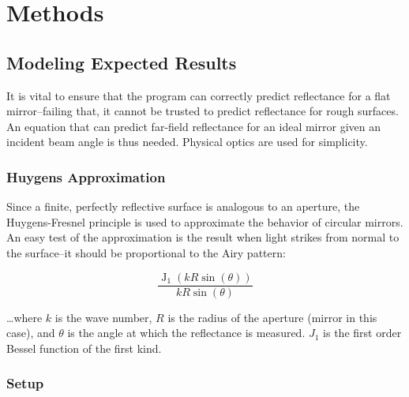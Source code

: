 \documentclass[etd,senior,noacknowledgments]{BYUPhys}
\DeclareMathOperator{\J}{J}
\begin{document}






\chapter{Methods} \label{chap:methods}

\section{Modeling Expected Results} \label{sec:expected_results}

It is vital to ensure that the program can correctly predict reflectance for a flat mirror--failing that, it cannot be trusted to predict reflectance for rough surfaces. An equation that can predict far-field reflectance for an ideal mirror given an incident beam angle is thus needed. Physical optics are used for simplicity.

\subsection{Huygens Approximation} \label{subsec:huygens_approx}

Since a finite, perfectly reflective surface is analogous to an aperture, the Huygens-Fresnel principle is used to approximate the behavior of circular mirrors. An easy test of the approximation is the result when light strikes from normal to the surface--it should be proportional to the Airy pattern:

\begin{equation}\label{eq:airy}
  \frac{\J_1(kR\sin(\theta))}{kR\sin(\theta)}
\end{equation}

\ldots where $k$ is the wave number, $R$ is the radius of the aperture (mirror in this case), and $\theta$ is the angle at which the reflectance is measured. $J_1$ is the first order Bessel function of the first kind.

\subsection{Setup} \label{sec:setup}
\end{document}
